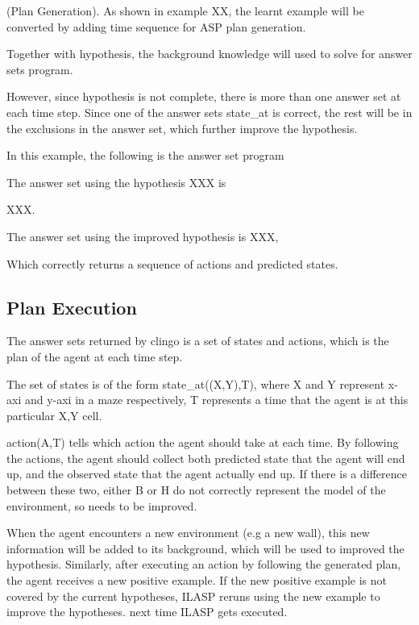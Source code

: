 \begin{examp} \normalfont (Plan Generation).
As shown in example XX, the learnt example will be converted by adding time sequence for ASP plan generation.

Together with hypothesis, the background knowledge will used to solve for answer sets program. 

However, since hypothesis is not complete, there is more than one answer set at each time step. Since one of the answer sets state\_at is correct, the rest will be in the exclusions in the answer set, 
which further improve the hypothesis.

In this example, the following is the answer set program

The answer set using the hypothesis XXX is 

XXX. 

The answer set using the improved hypothesis is XXX, 

Which correctly returns a sequence of actions and predicted states. 

\end{examp}

\subsection{Plan Execution}
\label{subsec:plan_execution}

The answer sets returned by clingo is a set of states and actions, which is the plan of the agent at each time step.

The set of states is of the form state\_at((X,Y),T), where X and Y represent x-axi and y-axi in a maze respectively, T represents a time that the agent is at
this particular X,Y cell.

action(A,T) tells which action the agent should take at each time. By following the actions, the agent should collect both predicted state that the
agent will end up, and the observed state that the agent actually end up. If there is a difference between these two, either B or H do not correctly represent
the model of the environment, so needs to be improved.

When the agent encounters a new environment (e.g a new wall), this new information will be added to its background, which will be used to improved the hypothesis. 
Similarly, after executing an action by following the generated plan, the agent receives a new positive example. If the new positive example is not covered by the current hypotheses, 
ILASP reruns using the new example to improve the hypotheses. 
next time ILASP gets executed.


